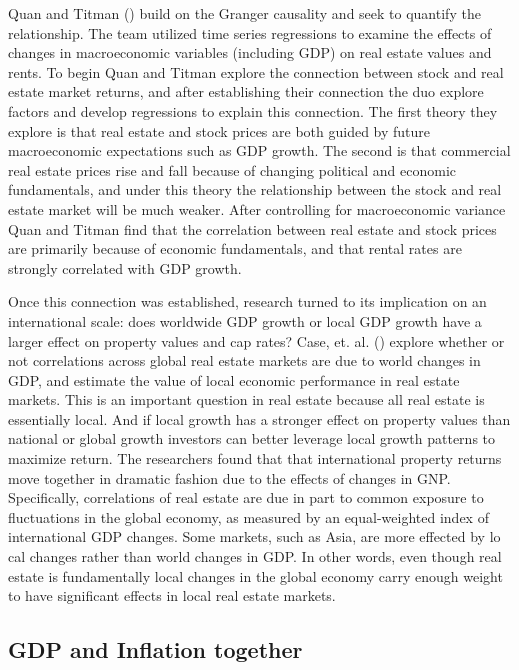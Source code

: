 Quan and Titman (\citeyear{quan1997commercial}) build on the Granger causality and seek to quantify the relationship. The team utilized time series regressions to examine the effects of changes in macroeconomic variables (including GDP) on real estate values and rents. To begin Quan and Titman explore the connection between stock and real estate market returns, and after establishing their connection the duo explore factors and develop regressions to explain this connection. The first theory they explore is that real estate and stock prices are both guided by future macroeconomic expectations such as GDP growth. The second is that commercial real estate prices rise and fall because of changing political and economic fundamentals, and under this theory the relationship between the stock and real estate market will be much weaker. After controlling for macroeconomic variance Quan and Titman find that the correlation between real estate and stock prices are primarily because of economic fundamentals, and that rental rates are strongly correlated with GDP growth.

Once this connection was established, research turned to its implication on an international scale: does worldwide GDP growth or local GDP growth have a larger effect on property values and cap rates? Case, et. al. (\citeyear{case2000global}) explore whether or not correlations across global real estate markets are due to world changes in GDP, and estimate the value of local economic performance in real estate markets. This is an important question in real estate because all real estate is essentially local. And if local growth has a stronger effect on property values than national or global growth investors can better leverage local growth patterns to maximize return. The researchers found that that international property returns move together in dramatic fashion due to the effects of changes in GNP. Specifically, correlations of real estate are due in part to common exposure to fluctuations in the global economy, as measured by an equal-weighted index of international GDP changes. Some markets, such as Asia, are more effected by lo cal changes rather than world changes in GDP. In other words, even though real estate is fundamentally local changes in the global economy carry enough weight to have significant effects in local real estate markets.

\subsection{GDP and Inflation together}

